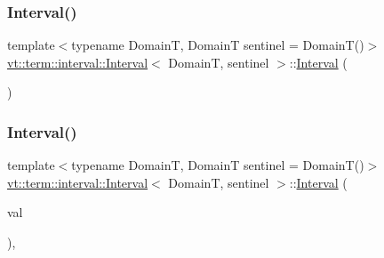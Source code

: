 \subsubsection{\texorpdfstring{Interval()}{Interval()}\hspace{0.1cm}{\footnotesize\ttfamily [3/5]}}
{\footnotesize\ttfamily template$<$typename DomainT, DomainT sentinel = Domain\+T()$>$ \\
\hyperlink{structvt_1_1term_1_1interval_1_1_interval}{vt\+::term\+::interval\+::\+Interval}$<$ DomainT, sentinel $>$\+::\hyperlink{structvt_1_1term_1_1interval_1_1_interval}{Interval} (\begin{DoxyParamCaption}\item[{\hyperlink{structvt_1_1term_1_1interval_1_1_interval}{Interval}$<$ DomainT, sentinel $>$ \&\&}]{ }\end{DoxyParamCaption})\hspace{0.3cm}{\ttfamily [default]}}

\mbox{\label{structvt_1_1term_1_1interval_1_1_interval_ac4d9f09fc40777980cb6b7efc3bc2d0d}} 
\subsubsection{\texorpdfstring{Interval()}{Interval()}\hspace{0.1cm}{\footnotesize\ttfamily [4/5]}}
{\footnotesize\ttfamily template$<$typename DomainT, DomainT sentinel = Domain\+T()$>$ \\
\hyperlink{structvt_1_1term_1_1interval_1_1_interval}{vt\+::term\+::interval\+::\+Interval}$<$ DomainT, sentinel $>$\+::\hyperlink{structvt_1_1term_1_1interval_1_1_interval}{Interval} (\begin{DoxyParamCaption}\item[{DomainT const \&}]{val }\end{DoxyParamCaption})\hspace{0.3cm}{\ttfamily [inline]}, {\ttfamily [explicit]}}

\mbox{\label{structvt_1_1term_1_1interval_1_1_interval_a9e1d8a552f0f204c9e391ac47cca7b1b}} 
